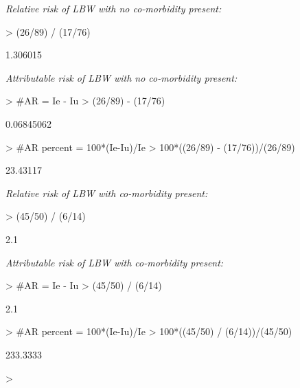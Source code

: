 \documentclass[12pt]{article}
\begin{document}
\begin{multicols}{2}

\emph{Relative risk of LBW with no co-morbidity present:} \\
\begin{Schunk}
\begin{Sinput}
> (26/89) / (17/76)
\end{Sinput}
\begin{Soutput}
[1] 1.306015
\end{Soutput}
\end{Schunk}

\emph{Attributable risk of LBW with no co-morbidity present:} \\
\begin{Schunk}
\begin{Sinput}
> #AR = Ie - Iu
> (26/89) - (17/76)
\end{Sinput}
\begin{Soutput}
[1] 0.06845062
\end{Soutput}
\begin{Sinput}
> #AR percent = 100*(Ie-Iu)/Ie
> 100*((26/89) - (17/76))/(26/89)
\end{Sinput}
\begin{Soutput}
[1] 23.43117
\end{Soutput}
\end{Schunk}


\vfill
\columnbreak

\emph{Relative risk of LBW with co-morbidity present:} \\
\begin{Schunk}
\begin{Sinput}
> (45/50) / (6/14)
\end{Sinput}
\begin{Soutput}
[1] 2.1
\end{Soutput}
\end{Schunk}


\emph{Attributable risk of LBW with  co-morbidity present:} \\
\begin{Schunk}
\begin{Sinput}
> #AR = Ie - Iu
> (45/50) / (6/14)
\end{Sinput}
\begin{Soutput}
[1] 2.1
\end{Soutput}
\begin{Sinput}
> #AR percent = 100*(Ie-Iu)/Ie
> 100*((45/50) / (6/14))/(45/50) 
\end{Sinput}
\begin{Soutput}
[1] 233.3333
\end{Soutput}
\begin{Sinput}
> 
\end{Sinput}
\end{Schunk}


\end{multicols}
\end{document}

